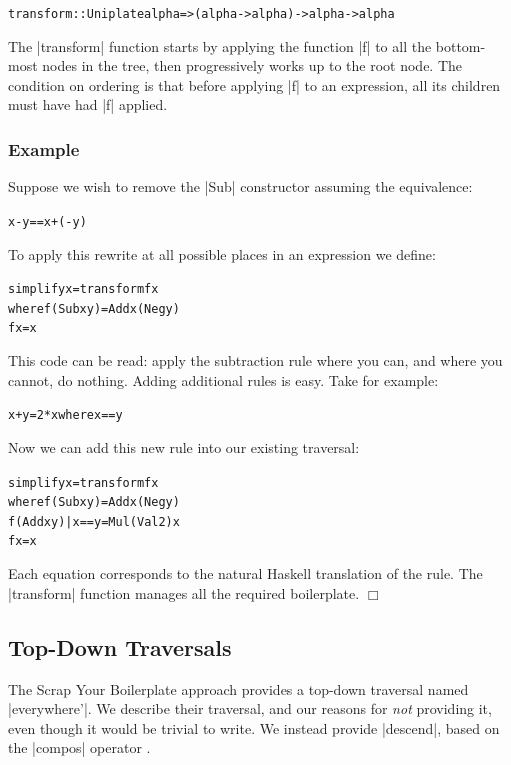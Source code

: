\documentclass[preprint]{sigplanconf}
\let\cite=\citep
\newcounter{exmp}
\newcommand{\yesexample}{\subsubsection*{Example \arabic{exmp}}\refstepcounter{exmp}}
\newcommand{\noexample}{\hfill$\Box$}
\newenvironment{code}{\begin{alltt}\small}{\end{alltt}}
\newenvironment{example}{\yesexample}{\noexample}
\newcommand{\ignore}{}
\begin{document}
\begin{code}
transform :: Uniplate alpha => (alpha -> alpha) -> alpha -> alpha
\end{code}

The |transform| function starts by applying the function |f| to all the bottom-most nodes in the tree, then progressively works up to the root node. The condition on ordering is that before applying |f| to an expression, all its children must have had |f| applied.

\begin{example}
\label{ex:simplify}
Suppose we wish to remove the |Sub| constructor assuming the equivalence:

\ignore\begin{code}
x - y == x + (- y)
\end{code}

To apply this rewrite at all possible places in an expression we define:

\begin{code}
simplify x = transform f x
    where  f (Sub x y)  = Add x (Neg y)
           f x          = x
\end{code}

This code can be read: apply the subtraction rule where you can, and where you cannot, do nothing. Adding additional rules is easy. Take for example:

\ignore\begin{code}
x + y = 2 * x       where x == y
\end{code}

Now we can add this new rule into our existing traversal:

\begin{code}
simplify x = transform f x
    where  f (Sub x y)           = Add x (Neg y)
           f (Add x y) | x == y  = Mul (Val 2) x
           f x                   = x
\end{code}

Each equation corresponds to the natural Haskell translation of the rule. The |transform| function manages all the required boilerplate.
\end{example}

\subsection{Top-Down Traversals}

The Scrap Your Boilerplate approach \cite{lammel:syb} provides a top-down traversal named |everywhere'|. We describe their traversal, and our reasons for \textit{not} providing it, even though it would be trivial to write. We instead provide |descend|, based on the |compos| operator \cite{bringert:compos}.
\end{document}
